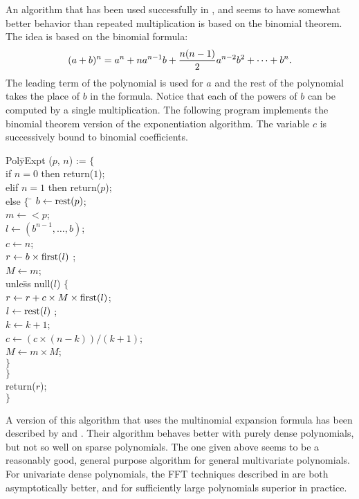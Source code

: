 \medskip
An algorithm that has been used successfully in \Macsyma, and seems to have
somewhat better behavior than repeated multiplication is based on the
binomial theorem.  The idea is based on the binomial formula:
\[
(a + b)^n = a^n + n a^{n-1} b + {n (n - 1) \over 2} a^{n-2} b^2 +
\cdots + b^n.
\]
The leading term of the polynomial is used for $a$ and the rest of the
polynomial takes the place of $b$ in the formula.  Notice that each of the
powers of $b$ can be computed by a single multiplication.  The following
program implements the binomial theorem version of the exponentiation
algorithm.  The variable $c$ is successively bound to binomial
coefficients. 

\begindsacode
Pol\=yExpt ($p$, $n$) := $\{$ \\
\> if $n=0$ then return($1$); \\
\> elif $n=1$ then return($p$); \\
\> else $\{$ \= $b \leftarrow \mbox{\rm rest}(p)$; \\
\> \> $m \leftarrow \lt p$; \\
\> \> $l \leftarrow (b^{n-1}, \ldots, b)$; \\
\> \> $c \leftarrow n$; \\
\> \> $r \leftarrow b \times \mbox{\rm first}(l)$ ; \\
\> \> $M \leftarrow m$; \\
\> \> unle\=ss null($l$) $\{$ \\
\> \> \> $r \leftarrow r + c \times M \times \mbox{\rm first}(l)$; \\
\> \> \> $l \leftarrow \mbox{\rm rest}(l)$ ; \\
\> \> \> $k \leftarrow k+1$; \\
\> \> \> $c \leftarrow (c \times (n - k))/(k+1)$; \\
\> \> \> $M \leftarrow m \times M$; \\
\> \> \> $\}$ \\
\> \> $\}$ \\
\> \> return($r$); \\
\> $\}$
\enddsacode

A version of this algorithm that uses the multinomial expansion
formula has been described by {\Alagar} and {\Probst}
\cite{Alagar:Probst87}.  Their algorithm behaves better with purely
dense polynomials, but not so well on sparse polynomials.  The one
given above seems to be a reasonably good, general purpose algorithm
for general multivariate polynomials.  For univariate dense
polynomials, the FFT techniques described in 
are both asymptotically better, and for sufficiently large polynomials
superior in practice.

